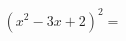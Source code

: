\documentclass[preview]{standalone}
\begin{document}
\begin{align*}
(x^2 - 3x + 2)^2 =
\end{align*}
\end{document}
